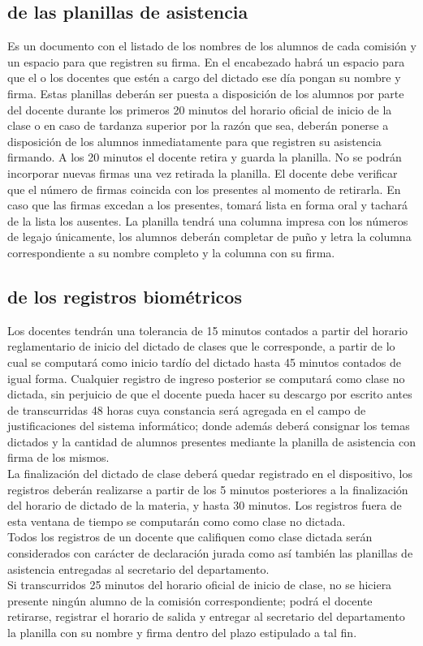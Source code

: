 \documentclass[a4paper, 11pt]{article} %
\begin{document}
\subsection{de las planillas de asistencia}

Es un documento con el listado de los nombres de los alumnos de cada comisión y un espacio para que registren su firma.
En el encabezado habrá un espacio para que el o los docentes que estén a cargo del dictado ese día pongan su nombre y firma. Estas planillas deberán ser puesta a disposición de los alumnos por parte del docente durante los primeros 20 minutos del horario oficial de inicio de la clase o en caso de tardanza superior por la razón que sea, deberán ponerse a disposición de los alumnos inmediatamente para que registren su asistencia firmando. A los 20 minutos el docente retira y guarda la planilla. No se podrán incorporar nuevas firmas una vez retirada la planilla. El docente debe verificar que el número de firmas coincida con los presentes al momento de retirarla. En caso que las firmas excedan a los presentes, tomará lista en forma oral y tachará de la lista los ausentes. La planilla tendrá una columna impresa con los números de legajo únicamente, los alumnos deberán completar de puño y letra la columna correspondiente a su nombre completo y la columna con su firma.\\
\subsection{de los registros biométricos}
Los docentes tendrán una tolerancia de 15 minutos contados a partir del horario reglamentario de inicio del dictado de clases que le corresponde, a partir de lo cual se computará como inicio tardío del dictado hasta 45 minutos contados de igual forma. Cualquier registro de ingreso posterior se computará como clase no dictada, sin perjuicio de que el docente pueda hacer su descargo por escrito antes de transcurridas 48 horas cuya constancia será agregada en el campo de justificaciones del sistema informático; donde además deberá consignar los temas dictados y la cantidad de alumnos presentes mediante la planilla de asistencia con firma de los mismos.\\
La finalización del dictado de clase deberá quedar registrado en el dispositivo, los registros deberán realizarse a partir de los 5 minutos posteriores a la finalización del horario de dictado de la materia, y hasta 30 minutos. Los registros fuera de esta ventana de tiempo se computarán como como clase no dictada.\\
Todos los registros de un docente que califiquen como clase dictada serán considerados con carácter de declaración jurada como así también las planillas de asistencia entregadas al secretario del departamento.\\
Si transcurridos 25 minutos del horario oficial de inicio de clase, no se hiciera presente ningún alumno de la comisión correspondiente; podrá el docente retirarse, registrar el horario de salida y entregar al secretario del departamento la planilla con su nombre y firma dentro del plazo estipulado a tal fin.\\
\end{document}
